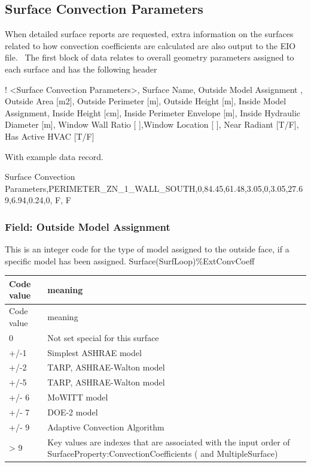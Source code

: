 \subsection{Surface Convection Parameters}\label{surface-convection-parameters}

When detailed surface reports are requested, extra information on the surfaces related to how convection coefficients are calculated are also output to the EIO file.~ The first block of data relates to overall geometry parameters assigned to each surface and has the following header

! \textless{}Surface Convection Parameters\textgreater{}, Surface Name, Outside Model Assignment , Outside Area {[}m2{]}, Outside Perimeter {[}m{]}, Outside Height {[}m{]}, Inside Model Assignment, Inside Height {[}cm{]}, Inside Perimeter Envelope {[}m{]}, Inside Hydraulic Diameter {[}m{]}, Window Wall Ratio {[} {]},Window Location {[} {]}, Near Radiant {[}T/F{]}, Has Active HVAC {[}T/F{]}

With example data record.

Surface Convection Parameters,PERIMETER\_ZN\_1\_WALL\_SOUTH,0,84.45,61.48,3.05,0,3.05,27.69,6.94,0.24,0, F, F

\subsubsection{Field: Outside Model Assignment}\label{field-outside-model-assignment}

This is an integer code for the type of model assigned to the outside face, if a specific model has been assigned. Surface(SurfLoop)\%ExtConvCoeff

\begin{longtable}[c]{p{1.5in}p{4.5in}}
\toprule
Code value & meaning \tabularnewline
\midrule
\endfirsthead

\toprule
Code value & meaning \tabularnewline
\midrule
\endhead

0 & Not set special for this surface \tabularnewline
+/-1 & Simplest ASHRAE model \tabularnewline
+/-2 & TARP, ASHRAE-Walton model \tabularnewline
+/-5 & TARP, ASHRAE-Walton model \tabularnewline
+/- 6 & MoWITT model \tabularnewline
+/- 7 & DOE-2 model \tabularnewline
+/- 9 & Adaptive Convection Algorithm \tabularnewline
> 9 & Key values are indexes that are associated with the input order of SurfaceProperty:ConvectionCoefficients ( and MultipleSurface) \tabularnewline
\bottomrule
\end{longtable}


